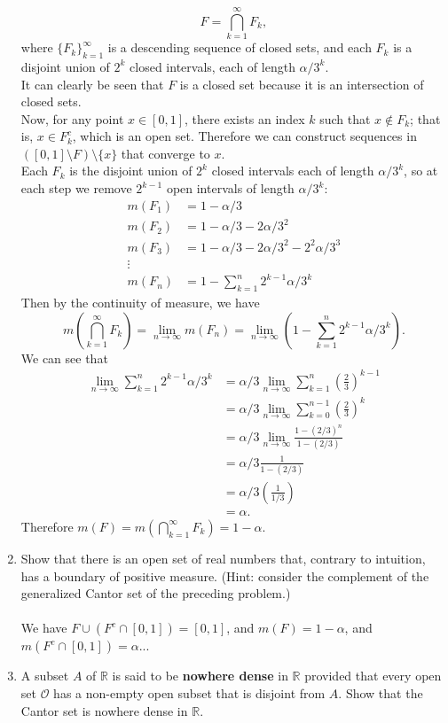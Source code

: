 \begin{enumerate}
	\[
		F=\bigcap_{k=1}^\infty F_k,	
	\]
	where $\{F_k\}_{k=1}^\infty$ is a descending sequence of closed sets, and each $F_k$ is a disjoint union of $2^k$ closed intervals, each of length $\alpha/3^k$.
	\\It can clearly be seen that $F$ is a closed set because it is an intersection of closed sets.
	\\Now, for any point $x\in[0,1]$, there exists an index $k$ such that $x\notin F_k$; that is, $x\in F_k^c$, which is an open set. Therefore we can construct sequences in $([0,1]\setminus F)\setminus\{x\}$ that converge to $x$.
	\\Each $F_k$ is the disjoint union of $2^k$ closed intervals each of length $\alpha/3^k$, so at each step we remove $2^{k-1}$ open intervals of length $\alpha/3^k$:
	\begin{align*}
		m(F_1)&=1-\alpha/3\\
		m(F_2)&=1-\alpha/3-2\alpha/3^2\\
		m(F_3)&=1-\alpha/3-2\alpha/3^2-2^2\alpha/3^3\\
		\vdots\\
		m(F_n)&=1-\sum_{k=1}^n2^{k-1}\alpha/3^k
	\end{align*}
	Then by the continuity of measure, we have \[m(\bigcap_{k=1}^\infty F_k)=\lim_{n\to\infty}m(F_n)=\lim_{n\to\infty}(1-\sum_{k=1}^n2^{k-1}\alpha/3^k).\]
	We can see that
	\begin{align*}
		\lim_{n\to\infty}\sum_{k=1}^n2^{k-1}\alpha/3^k&=\alpha/3\lim_{n\to\infty}\sum_{k=1}^n(\frac{2}{3})^{k-1}\\
		&=\alpha/3\lim_{n\to\infty}\sum_{k=0}^{n-1}(\frac{2}{3})^{k}\\
		&=\alpha/3\lim_{n\to\infty}\frac{1-(2/3)^n}{1-(2/3)}\\
		&=\alpha/3\frac{1}{1-(2/3)}\\
		&=\alpha/3(\frac{1}{1/3})\\
		&=\alpha.
	\end{align*}
	Therefore $m(F)=m(\bigcap_{k=1}^\infty F_k)=1-\alpha$.
	\item Show that there is an open set of real numbers that, contrary to intuition, has a boundary of positive measure. (Hint: consider the complement of the generalized Cantor set of the preceding problem.)\\
	\\We have $F\cup(F^c\cap[0,1])=[0,1]$, and $m(F)=1-\alpha$, and $m(F^c\cap[0,1])=\alpha$...
	\item A subset $A$ of $\mathbb{R}$ is said to be \textbf{nowhere dense} in $\mathbb{R}$ provided that every open set $\mathcal{O}$ has a non-empty open subset that is disjoint from $A$. Show that the Cantor set is nowhere dense in $\mathbb{R}$.\\

\end{enumerate}
